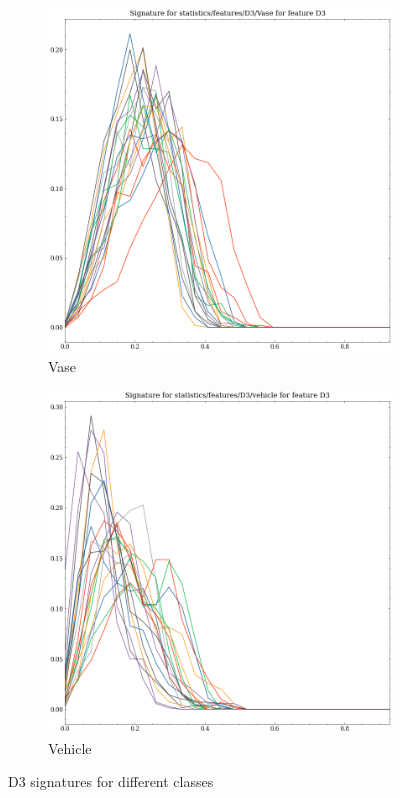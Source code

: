 \begin{figure}
    \begin{subfigure}[b]{0.23\textwidth}
        \includegraphics[width=\textwidth]{assets/feature_extraction/D3/Vase.png}
        \caption{Vase}
    \end{subfigure}
    \hfill
    \begin{subfigure}[b]{0.23\textwidth}
        \includegraphics[width=\textwidth]{assets/feature_extraction/D3/vehicle.png}
        \caption{Vehicle}
    \end{subfigure}
    \hfill
    
    \caption{D3 signatures for different classes}
    \label{fig:D3-signatures-2}
\end{figure}

